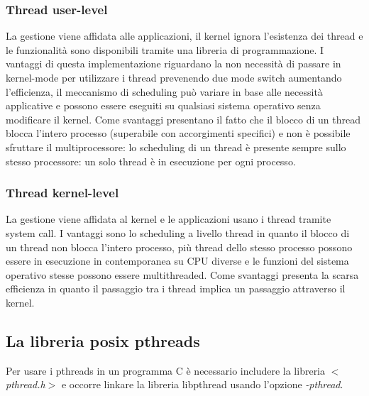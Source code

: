 \subsubsection{Thread user-level}
La gestione viene affidata alle applicazioni, il kernel ignora l'esistenza dei thread e le funzionalit\`a sono disponibili tramite una libreria di programmazione. I vantaggi di questa 
implementazione riguardano la non necessit\`a di passare in kernel-mode per utilizzare i thread prevenendo due mode switch aumentando l'efficienza, il meccanismo di scheduling pu\`o 
variare in base alle necessit\`a applicative e possono essere eseguiti su qualsiasi sistema operativo senza modificare il kernel. Come svantaggi presentano il fatto che il blocco di 
un thread blocca l'intero processo (superabile con accorgimenti specifici) e non \`e possibile sfruttare il multiprocessore: lo scheduling di un thread \`e presente sempre sullo stesso
processore: un solo thread \`e in esecuzione per ogni processo.
\subsubsection{Thread kernel-level}
La gestione viene affidata al kernel e le applicazioni usano i thread tramite system call. I vantaggi sono lo scheduling a livello thread in quanto il blocco di un thread non blocca
l'intero processo, pi\`u thread dello stesso processo possono essere in esecuzione in contemporanea su CPU diverse e le funzioni del sistema operativo stesse possono essere  
multithreaded. Come svantaggi presenta la scarsa efficienza in quanto il passaggio tra i thread implica un passaggio attraverso il kernel.
\subsection{La libreria posix pthreads}
Per usare i pthreads in un programma C \`e necessario includere la libreria \emph{$<$pthread.h$>$} e occorre linkare la libreria libpthread usando l'opzione \emph{-pthread}. 

